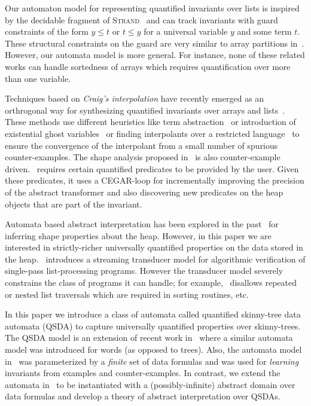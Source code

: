 \documentclass{llncs}
\newcommand{\Strand}{\textsc{Strand}\xspace}
\begin{document}
Our automaton model for representing quantified invariants over lists is inspired by the decidable fragment of \Strand~\cite{popl11} and can track invariants with guard constraints of the form $y \leq t$ or $t \leq y$ for a universal variable $y$ and some term $t$. These structural constraints on the guard are very similar to array partitions in~\cite{gopan,halbwachs-pldi08,cousot-logozzo}. However, our automata model is more general. For instance, none of these related works can handle sortedness of arrays which requires quantification over more than one variable.

Techniques based on \emph{Craig's interpolation} have recently emerged as an orthrogonal way for synthesizing quantified invariants over arrays and lists~\cite{mcmillan06,mcmillan08,natasha,podelski}.
These methods use different heuristics like term abstraction~\cite{podelski} or introduction of existential ghost variables~\cite{natasha} or finding interpolants over a restricted language~\cite{mcmillan06,mcmillan08} to ensure the convergence of the interpolant from a small number of spurious counter-examples.
The shape analysis proposed in~\cite{podelski07} is also counter-example driven.~\cite{podelski07} requires certain quantified predicates to be provided by the user. Given these predicates, it uses a CEGAR-loop for incrementally improving the precision of the abstract transformer and also discovering new predicates on the heap objects that are part of the invariant.

Automata based abstract interpretation has been explored in the past~\cite{forest-automata} for inferring shape properties about the heap. However, in this paper we are interested in strictly-richer universally quantified properties on the data stored in the heap.~\cite{streaming-transducer} introduces a streaming transducer model for algorithmic verification of single-pass list-processing programs. However the transducer model severely constrains the class of programs it can handle; for example,~\cite{streaming-transducer} disallows repeated or nested list traversals which are required in sorting routines, etc.

In this paper we introduce a class of automata called quantified skinny-tree data automata (QSDA) to capture universally quantified properties over skinny-trees. The QSDA model is an extension of recent work in~\cite{CAVQDA} where a similar automata model was introduced for words (as opposed to trees). Also,
the automata model in~\cite{CAVQDA} was parameterized by a \emph{finite} set of data formulas and was used for \emph{learning} invariants from examples and counter-examples. In contrast, we extend the automata in~\cite{CAVQDA} to be instantiated with a (possibly-infinite) abstract domain over data formulas and develop a theory of abstract interpretation over QSDAs.
\end{document}
